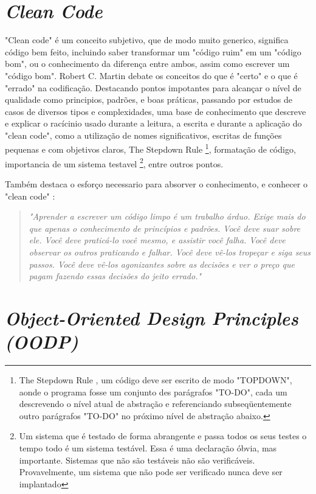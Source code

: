 \documentclass[12pt]{article}
\begin{document}
\section{\textit{Clean Code}} \label{sec:cleancode}

"Clean code" \cite{ROBERT_MARTIN_CLEAN_CODE} é um conceito subjetivo, que de modo muito generico, significa código bem feito, incluindo saber transformar um "código ruim" em um "código bom", ou o conhecimento da diferença entre ambos, assim como escrever um "código bom". Robert C. Martin \cite{ROBERT_MARTIN_CLEAN_CODE} debate os conceitos do que é "certo" e o que é "errado" na codificação. Destacando pontos impotantes para alcançar o nível de qualidade como principios, padrões, e boas práticas, passando por estudos de casos de diversos tipos e complexidades, uma base de conhecimento que descreve e explicar o racícinio usado durante a leitura, a escrita e durante a aplicação do "clean code", como a utilização de nomes significativos, escritas de funções pequenas e com objetivos claros, The Stepdown Rule \footnote{The Stepdown Rule \cite{ROBERT_MARTIN_CLEAN_CODE}, um código deve ser escrito de modo "TOPDOWN", aonde o programa fosse um conjunto des parágrafos "TO-DO", cada um descrevendo o nível atual de abstração e referenciando subseqüentemente outro parágrafos "TO-DO" no próximo nível de abstração abaixo.}, formatação de código, importancia de um sistema testavel \footnote{Um sistema que é testado de forma abrangente e passa todos os seus testes o tempo todo é um sistema testável. Essa é uma declaração óbvia, mas importante. Sistemas que não são testáveis
não são verificáveis. Provavelmente, um sistema que não pode ser verificado nunca deve ser implantado}, entre outros pontos. 

Também destaca o esforço necessario para absorver o conhecimento, e conhecer o "clean code" \cite{ROBERT_MARTIN_CLEAN_CODE}:

\begin{quotation}
\textit{"Aprender a escrever um código limpo é um trabalho árduo. Exige mais do que apenas o conhecimento de princípios e padrões. Você deve suar sobre ele. Você deve praticá-lo você mesmo, e assistir você falha. Você deve observar os outros praticando e falhar. Você deve vê-los tropeçar e siga seus passos. Você deve vê-los agonizantes sobre as decisões e ver o preço que pagam fazendo essas decisões do jeito errado." }
\end{quotation}

\section{\textit{Object-Oriented Design Principles (OODP)}} \label{sec:oopd}
 
\end{document}
